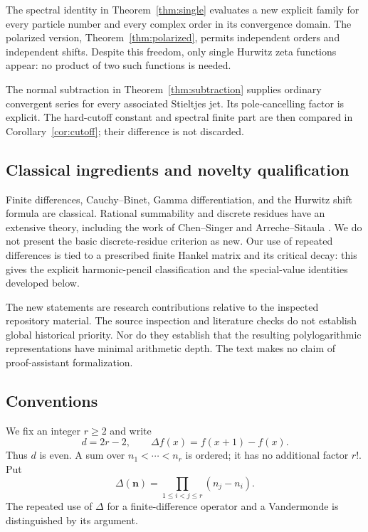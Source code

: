 The spectral identity in Theorem~\ref{thm:single} evaluates a new explicit
family for every particle number and every complex order in its convergence
domain. The polarized version, Theorem~\ref{thm:polarized}, permits independent
orders and independent shifts. Despite this freedom, only single Hurwitz
zeta functions appear: no product of two such functions is needed.

The normal subtraction in Theorem~\ref{thm:subtraction} supplies ordinary
convergent series for every associated Stieltjes jet. Its pole-cancelling
factor is explicit. The hard-cutoff constant and spectral finite part are
then compared in Corollary~\ref{cor:cutoff}; their difference is not discarded.

\subsection{Classical ingredients and novelty qualification}
Finite differences, Cauchy--Binet, Gamma differentiation, and the Hurwitz
shift formula are classical. Rational summability and discrete residues
have an extensive theory, including the work of Chen--Singer and
Arreche--Sitaula \cite{chen-singer,arreche-sitaula}. We do not present the
basic discrete-residue criterion as new. Our use of repeated differences
is tied to a prescribed finite Hankel matrix and its critical decay:
this gives the explicit harmonic-pencil classification and the special-value
identities developed below.

The new statements are research contributions relative to the inspected
repository material. The source inspection and literature checks do not
establish global historical priority. Nor do they establish that the
resulting polylogarithmic representations have minimal arithmetic depth.
The text makes no claim of proof-assistant formalization.

\subsection{Conventions}
We fix an integer $r\ge2$ and write
\begin{equation}\label{eq:d}
 d=2r-2,\qquad \Delta f(x)=f(x+1)-f(x).
\end{equation}
Thus $d$ is even. A sum over $n_1<\cdots<n_r$ is ordered; it has no
additional factor $r!$. Put
\[
 \Delta(\bm n)=\prod_{1\le i<j\le r}(n_j-n_i).
\]
The repeated use of $\Delta$ for a finite-difference operator and a
Vandermonde is distinguished by its argument.

